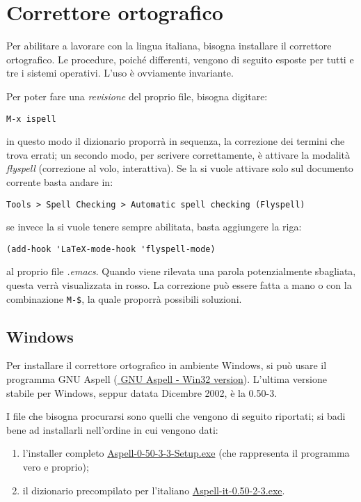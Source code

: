 \documentclass[10pt,a4paper]{article}
\begin{document}
\textcolor{red!50}{\lipsum[1]}

\section{Correttore ortografico}
\label{sec:corr}
Per abilitare \emacs{} a lavorare con la lingua italiana, bisogna
installare il correttore ortografico. Le procedure, poiché differenti,
vengono di seguito esposte per tutti e tre i sistemi operativi. 
L'uso è ovviamente invariante. 

Per poter fare una \emph{revisione} del proprio file, bisogna digitare:
\begin{Verbatim}
M-x ispell
\end{Verbatim}
in questo modo il dizionario proporrà in sequenza, la correzione
dei termini che trova errati; un secondo modo, per scrivere
correttamente, è attivare la modalità \emph{flyspell} (correzione al
volo, interattiva). Se la si vuole
attivare solo sul documento corrente basta andare in:
\begin{Verbatim}
Tools > Spell Checking > Automatic spell checking (Flyspell)
\end{Verbatim}
se invece la si vuole tenere sempre abilitata,
basta aggiungere la riga:
\begin{Verbatim}
(add-hook 'LaTeX-mode-hook 'flyspell-mode)
\end{Verbatim}
al proprio file \emph{.emacs}. Quando viene rilevata una parola
potenzialmente sbagliata, questa verrà visualizzata in rosso. La
correzione può essere fatta a mano o con la combinazione \verb!M-$!,
la quale proporrà possibili soluzioni.

\subsection*{Windows}
\label{sec:aspellwin}
Per installare il correttore ortografico in ambiente
Windows, si può usare il programma \textsf{GNU Aspell}
(\href{http://aspell.net/win32/}{\mano{} \textsf{GNU Aspell - Win32 version}}). L'ultima
versione stabile per Windows, seppur datata Dicembre 2002, è la \textsf{0.50-3}.

I file che bisogna procurarsi sono quelli che vengono di seguito
riportati; si badi bene ad installarli nell'ordine in cui vengono dati:

\begin{enumerate}
\item l'installer completo \href{http://ftp.gnu.org/gnu/aspell/w32/Aspell-0-50-3-3-Setup.exe}%
{\textsf{Aspell-0-50-3-3-Setup.exe}} (che rappresenta il programma
vero e proprio);
\item il dizionario precompilato per l'italiano
\href{http://ftp.gnu.org/gnu/aspell/w32/Aspell-it-0.50-2-3.exe}%
{\textsf{Aspell-it-0.50-2-3.exe}}.
\end{enumerate}
\end{document}
